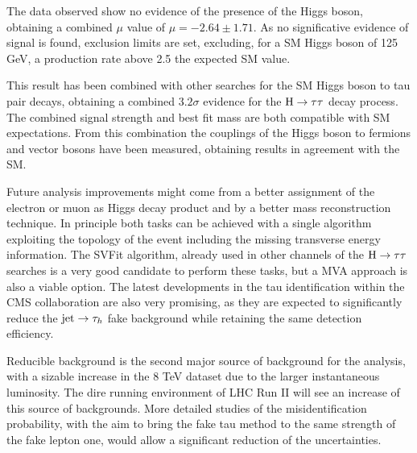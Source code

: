 The data observed show no evidence of the presence of the Higgs boson, obtaining a combined $\mu$ value of $\mu = -2.64 \pm 1.71$. As no significative evidence of signal is found, exclusion limits are set, excluding, for a SM Higgs boson of 125 GeV, a production rate above 2.5 the expected SM value.

This result has been combined with other searches for the SM Higgs boson to tau pair decays, obtaining a combined $3.2\sigma$ evidence for the $\mathrm{H} \rightarrow \tau \tau$ decay process. The combined signal strength and best fit mass are both compatible with SM expectations. From this combination the couplings of the Higgs boson to fermions and vector bosons have been measured, obtaining results in agreement with the SM.

%

Future analysis improvements might come from a better assignment of the electron or muon as Higgs decay product and by a better mass reconstruction technique. In principle both tasks can be achieved with a single algorithm exploiting the topology of the event including the missing transverse energy information. The SVFit algorithm, already used in other channels of the $\mathrm{H} \rightarrow \tau\tau$ searches is a very good candidate to perform these tasks, but a MVA approach is also a viable option. The latest developments in the tau identification within the CMS collaboration are also very promising, as they are expected to significantly reduce the $\mathrm{jet} \rightarrow \tau_h$ fake background while retaining the same detection efficiency.

Reducible background is the second major source of background for the analysis, with a sizable increase in the 8 TeV dataset due to the larger instantaneous luminosity. The dire running environment of LHC Run II will see an increase of this source of backgrounds. More detailed studies of the misidentification probability, with the aim to bring the fake tau method to the same strength of the fake lepton one, would allow %
a significant reduction of the uncertainties.
